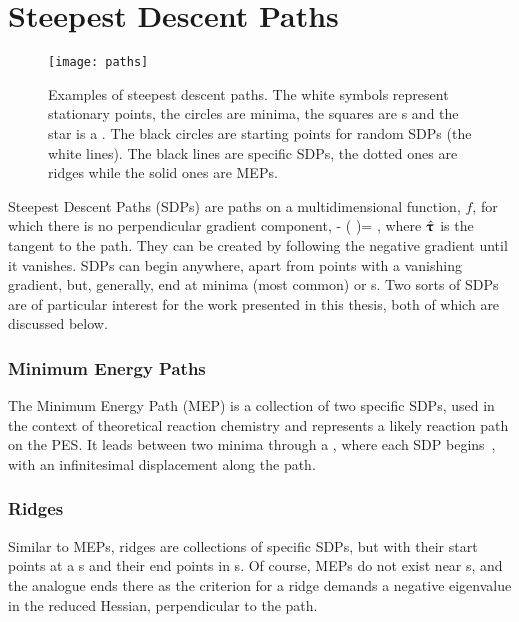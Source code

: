 \section{Steepest Descent Paths}
\label{sec:sdps}
\begin{figure}[h]
  \begin{center}
    \texttt{[image: paths]}
    \parbox{0.85\linewidth}{
      \caption{Examples of steepest descent paths.
The white symbols represent stationary points, the circles are minima, the squares are s and the star is a .
The black circles are starting points for random SDPs (the white lines).
The black lines are specific SDPs, the dotted ones are ridges while the solid ones are MEPs.
      }
      \label{fig:paths}
    }
  \end{center}
\end{figure}

Steepest Descent Paths (SDPs) are paths on a multidimensional function, $f$, for which there is no perpendicular gradient component,
\nabla {} - (\nabla {} \cdot \uvt)\uvt = ,
\eeq
where $\hat{{\mathrm{\mathbf{\bm{\uptau}}}}}$ is the tangent to the path.
They can be created by following the negative gradient until it vanishes.
SDPs can begin anywhere, apart from points with a vanishing gradient, but, generally, end at minima (most common) or \sap{}s.
Two sorts of SDPs are of particular interest for the work presented in this thesis, both of which are discussed below.

\subsubsection{Minimum Energy Paths}
The Minimum Energy Path (MEP) is a collection of two specific SDPs, used in the context of theoretical reaction chemistry and represents a likely reaction path on the PES.
It leads between two minima through a , where each SDP begins~\cite{neb-polemic-henkelman1}, with an infinitesimal displacement along the path.

\subsubsection{Ridges}
Similar to MEPs, ridges are collections of specific SDPs, but with their start points at a s and their end points in s.
Of course, MEPs do not exist near s, and the analogue ends there as the criterion for a ridge demands a negative eigenvalue in the reduced Hessian, perpendicular to the path.
